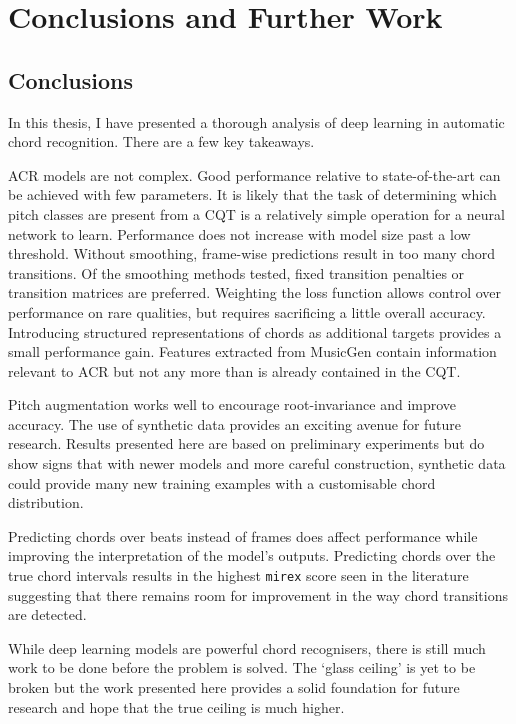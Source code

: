 
\chapter{Conclusions and Further Work}

\section{Conclusions}

In this thesis, I have presented a thorough analysis of deep learning in automatic chord recognition. There are a few key takeaways.

ACR models are not complex. Good performance relative to state-of-the-art can be achieved with few parameters. It is likely that the task of determining which pitch classes are present from a CQT is a relatively simple operation for a neural network to learn. Performance does not increase with model size past a low threshold. Without smoothing, frame-wise predictions result in too many chord transitions. Of the smoothing methods tested, fixed transition penalties or transition matrices are preferred. Weighting the loss function allows control over performance on rare qualities, but requires sacrificing a little overall accuracy. Introducing structured representations of chords as additional targets provides a small performance gain. Features extracted from MusicGen contain information relevant to ACR but not any more than is already contained in the CQT.

Pitch augmentation works well to encourage root-invariance and improve accuracy. The use of synthetic data provides an exciting avenue for future research. Results presented here are based on preliminary experiments but do show signs that with newer models and more careful construction, synthetic data could provide many new training examples with a customisable chord distribution.

Predicting chords over beats instead of frames does affect performance while improving the interpretation of the model's outputs. Predicting chords over the true chord intervals results in the highest \texttt{mirex} score seen in the literature suggesting that there remains room for improvement in the way chord transitions are detected.

While deep learning models are powerful chord recognisers, there is still much work to be done before the problem is solved. The `glass ceiling' is yet to be broken but the work presented here provides a solid foundation for future research and hope that the true ceiling is much higher.

